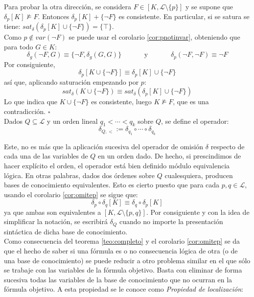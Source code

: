 Para probar la otra dirección, se considera $F\in [K, \mathcal{L} \setminus \{ p \}]$ y se supone que $\delta_p [K] \nvDash F$. Entonces $\delta_p [K] + \{ \neg F \}$ es consistente. En particular, si se satura se tiene: $sat_{\delta}(\delta_p [K] \cup \{ \neg F \}) = \{ \top \}$.\\
Como $p \notin var(\neg F)$ se puede usar el corolario \ref{cor:pnotinvar}, obteniendo que para todo $G\in K$:
$$\delta_g (\neg F, G) \equiv \{ \neg F, \delta_g  (G,G)  \} \;\;\;\;\;\;\;\;\;\;\;\; \text{y} \;\;\;\;\;\;\;\;\;\;\;\; \delta_p (\neg F , \neg F) \equiv \neg F$$
Por consiguiente,
$$\delta_p [K \cup \{ \neg F \}] \equiv \delta_p [K] \cup \{ \neg F \}$$
así que, aplicando saturación empezando por $p$:
$$sat_{\delta}(K \cup \{ \neg F \}) \equiv sat_{\delta}(\delta_p [K] \cup \{ \neg F \})$$
Lo que indica que $K \cup \{ \neg F \}$ es consistente, luego $K \nvDash F$, que es una contradicción. $\square$\\

Dados $Q \subseteq \mathcal{L}$ y un orden lineal $q_1 < \cdots < q_k$ sobre $Q$, se define el operador: $$\delta_{Q,<} := \delta_{q_1} \circ \cdots \circ \delta_{q_k}$$

Este, no es más que la aplicación sucesiva del operador de omisión $\delta$  respecto de cada una de las variables de $Q$ en un orden dado. De hecho, si prescindimos de hacer explícito el orden, el operador está bien definido módulo equivalencia lógica. En otras palabras, dados dos órdenes sobre $Q$ cualesquiera, producen bases de conocimiento equivalentes. Esto es cierto puesto que para cada $p,q \in \mathcal{L}$, usando el corolario \ref{cor:omitep} se sigue que:
$$ \delta_p \circ \delta_q [K] \equiv \delta_q \circ \delta_p [K]$$
\noindent ya que ambas son equivalentes a $[K, \mathcal{L} \setminus \{ p,q \}]$. Por consiguiente y con la idea de simplificar la notación, se escribirá $\delta_Q$ cuando no importe la presentación sintáctica de dicha base de conocimiento.\\

Como consecuencia del teorema \ref{teo:completo} y el corolario \ref{cor:omitep} se da que el hecho de saber si una fórmula es o no consecuencia lógica de otra (o de una base de conocimiento) se puede reducir a otro problema similar en el que sólo se trabaje con las variables de la fórmula objetivo. Basta con eliminar de forma sucesiva todas las variables de la base de conocimiento que no ocurran en la fórmula objetivo. A esta propiedad se le conoce como \textit{Propiedad de localización}:

